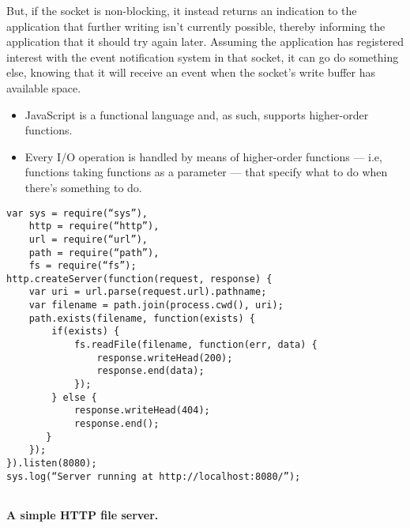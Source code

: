 \documentclass[12pt]{article}
\begin{document}
\hspace{1cm} But, if the socket is non-blocking, it instead returns an indication to the application that further writing isn’t currently possible, thereby informing the application that it should try again later. Assuming the application has registered interest with the event notification system in that socket, it can go do something else, knowing that it will receive an event when the socket’s write buffer 
has available space.


\begin{itemize}[noitemsep]
  \itemsep0.5em
  
  \item JavaScript is a functional language and, as such, supports higher-order functions.

  \item Every I/O operation is handled by means of higher-order functions — i.e, functions taking functions as a parameter — that specify what to do when there’s something to do. 

  
\end{itemize}

\clearpage

\begin{listing}[h]
\begin{verbatim}
var sys = require(“sys”),
	http = require(“http”),
	url = require(“url”),
 	path = require(“path”),
 	fs = require(“fs”);
http.createServer(function(request, response) {
	var uri = url.parse(request.url).pathname;
 	var filename = path.join(process.cwd(), uri);
 	path.exists(filename, function(exists) {
 		if(exists) {
 			fs.readFile(filename, function(err, data) {
 				response.writeHead(200);
 				response.end(data);
 			});
		} else {
 			response.writeHead(404);
 			response.end();
 	   }
 	});
}).listen(8080);
sys.log(“Server running at http://localhost:8080/”);


\end{verbatim}
\end{listing}

\begin{center}
\textbf{A simple HTTP file server.}
\end{center}
\end{document}
